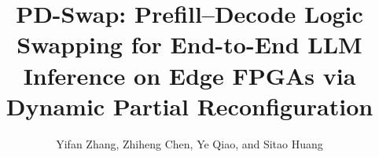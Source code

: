 \documentclass[9pt,sigconf]{acmart}
\begin{document}





\title{PD-Swap: Prefill–Decode Logic Swapping for End-to-End LLM Inference on Edge FPGAs via Dynamic Partial Reconfiguration}


\author{Yifan Zhang, Zhiheng Chen, Ye Qiao, and Sitao Huang}




\end{document}
